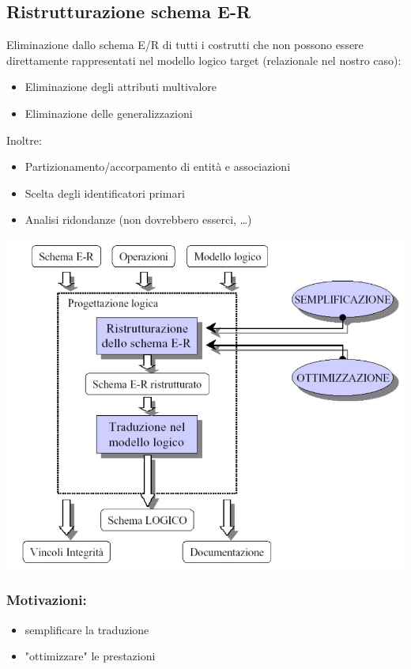 \subsection{Ristrutturazione schema E-R}
Eliminazione dallo schema E/R di tutti i costrutti che non possono essere direttamente rappresentati nel modello logico target (relazionale nel nostro caso):
\begin{itemize}
    \item Eliminazione degli attributi multivalore
    \item Eliminazione delle generalizzazioni
\end{itemize}
Inoltre:
\begin{itemize}
    \item Partizionamento/accorpamento di entità e associazioni
    \item Scelta degli identificatori primari
    \item Analisi ridondanze (non dovrebbero esserci, \dots)
\end{itemize}
\begin{center}
    \includegraphics[scale=0.675]{chaptersLezioniSara/img/PLog_intro4.jpg}
\end{center}
\subsubsection{Motivazioni:}
\begin{itemize}
    \item semplificare la traduzione
    \item "ottimizzare" le prestazioni
\end{itemize}
